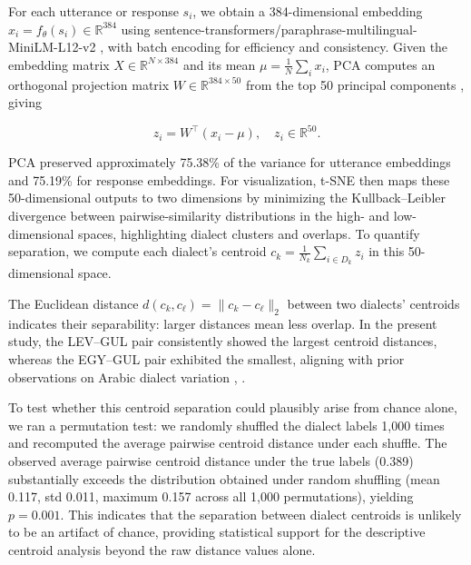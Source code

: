 \documentclass[conference]{IEEEtran}
\begin{document}
For each utterance or response $s_i$, we obtain a 384-dimensional embedding $x_i = f_\theta(s_i) \in \mathbb{R}^{384}$ using sentence-transformers/paraphrase-multilingual-MiniLM-L12-v2 \cite{reimers2019}, with batch encoding for efficiency and consistency. Given the embedding matrix $X \in \mathbb{R}^{N \times 384}$ and its mean $\mu = \frac{1}{N}\sum_i x_i$, PCA computes an orthogonal projection matrix $W \in \mathbb{R}^{384 \times 50}$ from the top 50 principal components \cite{jolliffe2002}, giving

\begin{equation}
z_i = W^\top (x_i - \mu), \quad z_i \in \mathbb{R}^{50}.
\label{eq:pca}
\end{equation}

PCA preserved approximately 75.38\% of the variance for utterance embeddings and 75.19\% for response embeddings. For visualization, t-SNE \cite{vandermaaten2008} then maps these 50-dimensional outputs to two dimensions by minimizing the Kullback--Leibler divergence between pairwise-similarity distributions in the high- and low-dimensional spaces, highlighting dialect clusters and overlaps. To quantify separation, we compute each dialect's centroid $c_k = \frac{1}{N_k}\sum_{i \in D_k} z_i$ in this 50-dimensional space.

The Euclidean distance $d(c_k,c_\ell) = \lVert c_k - c_\ell \rVert_2$ between two dialects' centroids indicates their separability: larger distances mean less overlap. In the present study, the LEV--GUL pair consistently showed the largest centroid distances, whereas the EGY--GUL pair exhibited the smallest, aligning with prior observations on Arabic dialect variation \cite{altwairesh2018}, \cite{elhaj2021}.

To test whether this centroid separation could plausibly arise from chance alone, we ran a permutation test: we randomly shuffled the dialect labels 1,000 times and recomputed the average pairwise centroid distance under each shuffle. The observed average pairwise centroid distance under the true labels (0.389) substantially exceeds the distribution obtained under random shuffling (mean 0.117, std 0.011, maximum 0.157 across all 1,000 permutations), yielding $p = 0.001$. This indicates that the separation between dialect centroids is unlikely to be an artifact of chance, providing statistical support for the descriptive centroid analysis beyond the raw distance values alone.
\end{document}
